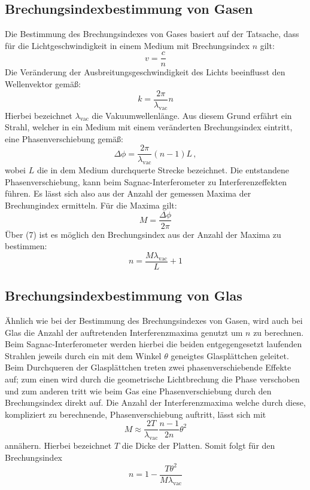 \subsection{Brechungsindexbestimmung von Gasen}
Die Bestimmung des Brechungsindexes von Gases basiert auf der Tatsache, dass für die Lichtgeschwindigkeit in einem Medium mit Brechungsindex $n$ gilt:
\begin{equation}
  v=\frac{c}{n}
\end{equation}
Die Veränderung der Ausbreitungsgeschwindigkeit des Lichts beeinflusst den Wellenvektor gemäß:
\begin{equation}
  k = \frac{2\pi}{\lambda_{\text{vac}}}n
\end{equation}
Hierbei bezeichnet $\lambda_{\text{vac}}$ die Vakuumwellenlänge.
Aus diesem Grund erfährt ein Strahl, welcher in ein Medium mit einem veränderten Brechungsindex eintritt, eine Phasenverschiebung gemäß:
\begin{equation}
  \Delta \phi= \frac{2\pi}{\lambda_{\text{vac}}}(n-1)L \, ,
\end{equation}
wobei  $L$ die in dem Medium durchquerte Strecke bezeichnet. Die entstandene Phasenverschiebung, kann beim Sagnac-Interferometer zu Interferenzeffekten führen. Es lässt sich also
aus der Anzahl der gemessen Maxima der Brechungindex ermitteln. Für die Maxima gilt:
\begin{equation}
  M = \frac{\Delta \phi}{2 \pi}
\end{equation}
Über (7) ist es möglich den Brechungsindex aus der Anzahl der Maxima zu bestimmen:
\begin{equation}
  n=\frac{M\lambda_{\text{vac}}}{L}+1
\end{equation}
\subsection{Brechungsindexbestimmung von Glas}
Ähnlich wie bei der Bestimmung des Brechungsindexes von Gasen, wird auch bei Glas die Anzahl der auftretenden Interferenzmaxima genutzt um $n$ zu berechnen. Beim Sagnac-Interferometer
werden hierbei die beiden entgegengesetzt laufenden Strahlen jeweils durch ein mit dem Winkel $\theta$ geneigtes Glasplättchen geleitet. Beim Durchqueren
der Glasplättchen treten zwei phasenverschiebende Effekte auf; zum einen wird durch die geometrische Lichtbrechung die Phase verschoben und zum anderen tritt wie beim
Gas eine Phasenverschiebung durch den Brechungsindex direkt auf.
Die Anzahl der Interferenzmaxima welche durch diese, kompliziert zu berechnende, Phasenverschiebung auftritt, lässt  sich mit
\begin{equation}
  M \approx \frac{2T}{\lambda_{\text{vac}}}\frac{n-1}{2n}\theta^2
\end{equation}
annähern. Hierbei bezeichnet $T$ die Dicke der Platten. Somit folgt für den Brechungsindex
\begin{equation}
  n=1-\frac{T\theta^2}{M\lambda_{\text{vac}}}
\end{equation}
